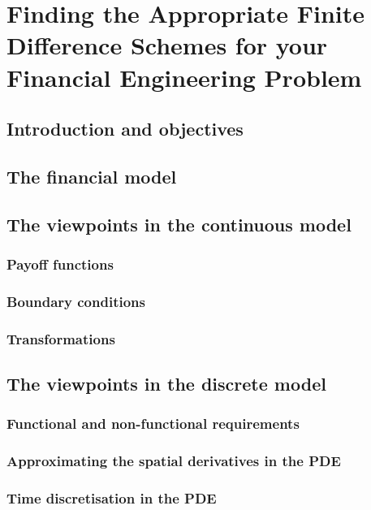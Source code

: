 \chapter{Finding the Appropriate Finite Difference Schemes for your Financial Engineering Problem}

\section{Introduction and objectives}

\section{The financial model}

\section{The viewpoints in the continuous model}

\subsection{Payoff functions}

\subsection{Boundary conditions}

\subsection{Transformations}

\section{The viewpoints in the discrete model}

\subsection{Functional and non-functional requirements}

\subsection{Approximating the spatial derivatives in the PDE}

\subsection{Time discretisation in the PDE}


